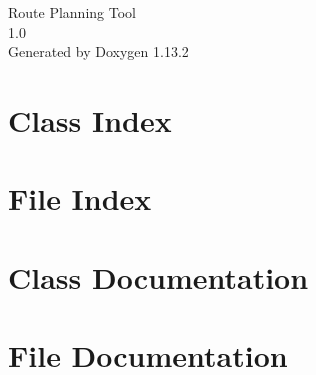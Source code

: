 \documentclass[twoside]{book}
\newcommand{\+}{\discretionary{\mbox{\scriptsize$\hookleftarrow$}}{}{}}
\newcommand{\clearemptydoublepage}{%
    \newpage{\pagestyle{empty}\cleardoublepage}%
  }
\begin{document}
  \raggedbottom
    \hypersetup{pageanchor=false,
                bookmarksnumbered=true,
                pdfencoding=unicode
               }
  \begin{titlepage}
  \vspace*{7cm}
  \begin{center}%
  {\Large Route Planning Tool}\\
  [1ex]\large 1.\+0 \\
  \vspace*{1cm}
  {\large Generated by Doxygen 1.13.2}\\
  \end{center}
  \end{titlepage}
  \clearemptydoublepage
  \tableofcontents
  \clearemptydoublepage
  \hypersetup{pageanchor=true}

\chapter{Class Index}

\chapter{File Index}

\chapter{Class Documentation}


\chapter{File Documentation}


























  \backmatter
  \newpage
  \clearemptydoublepage
  \printindex
\end{document}
